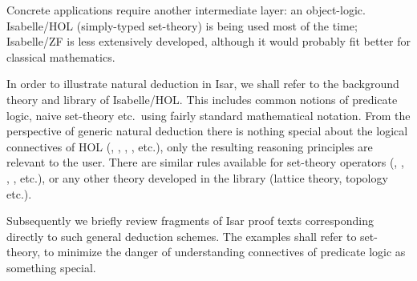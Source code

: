\begin{isabellebody}
\begin{isamarkuptext}
  Concrete applications require another intermediate layer: an
  object-logic.  Isabelle/HOL \cite{isa-tutorial} (simply-typed
  set-theory) is being used most of the time; Isabelle/ZF
  \cite{isabelle-ZF} is less extensively developed, although it would
  probably fit better for classical mathematics.

  \medskip In order to illustrate natural deduction in Isar, we shall
  refer to the background theory and library of Isabelle/HOL.  This
  includes common notions of predicate logic, naive set-theory etc.\
  using fairly standard mathematical notation.  From the perspective
  of generic natural deduction there is nothing special about the
  logical connectives of HOL (\isa{{\isachardoublequote}{\isasymand}{\isachardoublequote}}, \isa{{\isachardoublequote}{\isasymor}{\isachardoublequote}}, \isa{{\isachardoublequote}{\isasymforall}{\isachardoublequote}},
  \isa{{\isachardoublequote}{\isasymexists}{\isachardoublequote}}, etc.), only the resulting reasoning principles are
  relevant to the user.  There are similar rules available for
  set-theory operators (\isa{{\isachardoublequote}{\isasyminter}{\isachardoublequote}}, \isa{{\isachardoublequote}{\isasymunion}{\isachardoublequote}}, \isa{{\isachardoublequote}{\isasymInter}{\isachardoublequote}}, \isa{{\isachardoublequote}{\isasymUnion}{\isachardoublequote}}, etc.), or any other theory developed in the library (lattice
  theory, topology etc.).

  Subsequently we briefly review fragments of Isar proof texts
  corresponding directly to such general deduction schemes.  The
  examples shall refer to set-theory, to minimize the danger of
  understanding connectives of predicate logic as something special.


\end{isamarkuptext}
\end{isabellebody}

